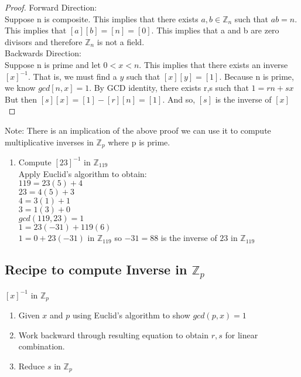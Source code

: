 \documentclass{article}
\theoremstyle{definition}
\theoremstyle{remark}
\begin{document}
\begin{proof}
Forward Direction:\\
Suppose n is composite. This implies that there exists $a,b \in \mathbb{Z}_n$ such that $ab = n$. This implies that $[a][b] = [n] = [0]$. This implies that a and b are zero divisors and therefore $\mathbb{Z}_n$ is not a field.\\
Backwards Direction:\\
Suppose n is prime and let $0 < x < n$. This implies that there exists an inverse $[x]^{-1}$. That is, we must find a $y$ such that $[x][y] = [1]$. Because n is prime, we know $gcd[n,x] = 1$. By GCD identity, there exists  r,s such that $1 = rn + sx$ But then $[s][x] = [1] - [r][n] = [1]$. And so, $[s]$ is the inverse of $[x]$
\end{proof}

Note: There is an implication of the above proof we can use it to compute multiplicative inverses in $\mathbb{Z}_p$ where p is prime.

\begin{enumerate}
\item{Compute $[23]^{-1}$ in $\mathbb{Z}_{119}$\\


	Apply Euclid's algorithm to obtain:\\
    $119 = 23(5) + 4$\\
    $23 = 4(5) + 3$\\
    $4 = 3(1) + 1$\\
    $3 = 1(3) + 0$\\
    $gcd(119,23) = 1$\\
	$1 = 23(-31) + 119(6)$\\

    $1 = 0 + 23(-31)$ in $\mathbb{Z}_{119}$
    so $-31 = 88$ is the inverse of $23$ in $\mathbb{Z}_{119}$

}
\end{enumerate}

\subsection{Recipe to compute Inverse in $\mathbb{Z}_{p}$}
$[x]^{-1}$ in $\mathbb{Z}_{p}$
\begin{enumerate}
\item Given $x$ and $p$ using Euclid's algorithm to show $gcd(p,x) = 1$
\item Work backward through resulting equation to obtain $r,s$ for linear combination.
\item Reduce $s$ in $\mathbb{Z}_{p}$
\end{enumerate}
\end{document}
